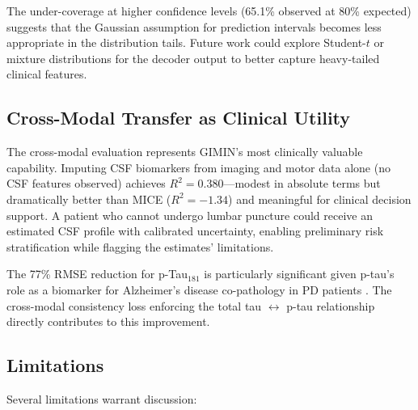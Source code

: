 \documentclass[journal,twoside,web]{ieeecolor}
\begin{document}
The under-coverage at higher confidence levels (65.1\% observed at 80\% expected) suggests that the Gaussian assumption for prediction intervals becomes less appropriate in the distribution tails. Future work could explore Student-$t$ or mixture distributions for the decoder output to better capture heavy-tailed clinical features.

\subsection{Cross-Modal Transfer as Clinical Utility}

The cross-modal evaluation represents GIMIN's most clinically valuable capability. Imputing CSF biomarkers from imaging and motor data alone (no CSF features observed) achieves $R^2 = 0.380$---modest in absolute terms but dramatically better than MICE ($R^2 = -1.34$) and meaningful for clinical decision support. A patient who cannot undergo lumbar puncture could receive an estimated CSF profile with calibrated uncertainty, enabling preliminary risk stratification while flagging the estimates' limitations.

The 77\% RMSE reduction for p-Tau$_{181}$ is particularly significant given p-tau's role as a biomarker for Alzheimer's disease co-pathology in PD patients \cite{marek2018ppmi_cohort}. The cross-modal consistency loss enforcing the total tau $\leftrightarrow$ p-tau relationship directly contributes to this improvement.

\subsection{Limitations}

Several limitations warrant discussion:
\end{document}
